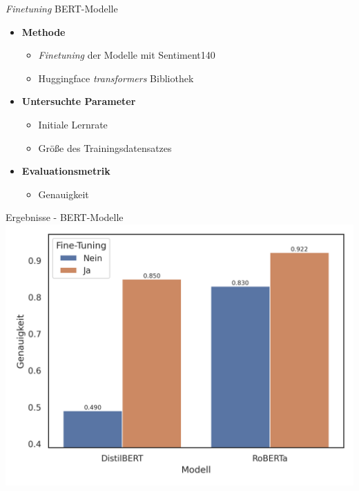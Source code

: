 \documentclass[aspectratio=169]{beamer} %
\begin{document}
\begin{frame}{\textit{Finetuning} BERT-Modelle}
\begin{itemize}
        \item \textbf{Methode}
            \begin{itemize}
                \item \textit{Finetuning} der Modelle mit Sentiment140
                \item Huggingface \textit{transformers} Bibliothek
            \end{itemize}
        \item \textbf{Untersuchte Parameter}
        \begin{itemize}
            \item Initiale Lernrate
            \item Größe des Trainingsdatensatzes
        \end{itemize}
        \item \textbf{Evaluationsmetrik}
        \begin{itemize}
            \item Genauigkeit
        \end{itemize}
\end{itemize}
\end{frame}

\begin{frame}{Ergebnisse - BERT-Modelle}
    \centering
     \includegraphics[scale=0.65]{../datasets/sentiment140/results/plots/bert-based-genauigkeit-bert-basierte-modelle-default-vs.-fine-tuned-truncated-y-axis.png}
\end{frame}
\end{document}
